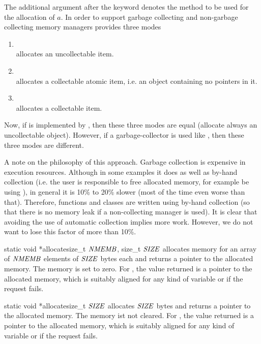 The additional argument after the  keyword denotes the method to be used for the
allocation of $a$. In order to support garbage collecting and non-garbage collecting memory
managers  provides three modes

\begin{enumerate}
\item {}\\
  allocates an uncollectable item.
\item {}\\
  allocates a collectable atomic item, i.e.
  an object containing no pointers in it.
\item {}\\
  allocates a collectable item.
\end{enumerate}

Now, if  is implemented by , then these three modes are equal (allocate
always an uncollectable object).  However, if a garbage-collector is used like
\cite{Boehm/Weiser:1988}, then these three modes are different.

A note on the philosophy of this approach. Garbage collection is expensive in execution
resources. Although in some examples it does as well as by-hand collection (i.e. the user is
responsible to free allocated memory, for example be using ), in general it is 10\%
to 20\% slower (most of the time even worse than that). Therefore, \LiDIA functions and classes
are written using by-hand collection (so that there is no memory leak if a non-collecting
manager is used). It is clear that avoiding the use of automatic collection implies more work.
However, we do not want to lose this factor of more than 10\%.



\BASIC

\begin{fcode}{{static void *}}{allocate}{size_t $\mathit{NMEMB}$, size_t $\mathit{SIZE}$}
  allocates memory for an array of $\mathit{NMEMB}$ elements of $\mathit{SIZE}$ bytes each and returns a pointer
  to the allocated memory. The memory is set to zero.  For ,
  the value returned is a pointer to the allocated memory, which is suitably aligned for any
  kind of variable or  if the request fails.
\end{fcode}

\begin{fcode}{{static void *}}{allocate}{size_t $\mathit{SIZE}$}
  allocates $\mathit{SIZE}$ bytes and returns a pointer to the allocated memory. The memory ist not
  cleared.  For , the value returned is a pointer to the
  allocated memory, which is suitably aligned for any kind of variable or  if the
  request fails.
\end{fcode}

